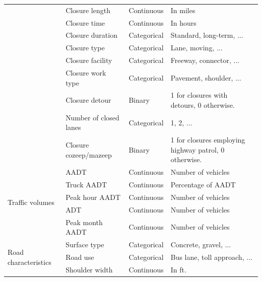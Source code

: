 \documentclass[10pt,a4paper]{article}
\begin{document}
\begin{table}[ht!]
\begin{tabular}{lllp{5cm}}
\multicolumn{1}{l|}{}                          & Closure length         & Continuous  & In miles\\
\multicolumn{1}{l|}{}                          & Closure time       & Continuous  & In hours\\
\multicolumn{1}{l|}{}                          & Closure duration       & Categorical  & Standard, long-term, ...\\
\multicolumn{1}{l|}{}                          & Closure type           & Categorical & Lane, moving, $\ldots$\\
\multicolumn{1}{l|}{}                          & Closure facility       & Categorical & Freeway, connector, $\ldots$\\
\multicolumn{1}{l|}{}                          & Closure work type      & Categorical & Pavement, shoulder, $\ldots$\\
\multicolumn{1}{l|}{}                          & Closure detour         & Binary      & 1 for closures with detours, 0 otherwise.\\
\multicolumn{1}{l|}{}                          & Number of closed lanes & Categorical & 1, 2, $\ldots$\\
\multicolumn{1}{l|}{}                          & Closure cozeep/mazeep  & Binary      & 1 for closures employing highway patrol, 0 otherwise.\\
\hline
\multicolumn{1}{l|}{\multirow{5}{*}{Traffic volumes}}  & AADT                   & Continuous  & Number of vehicles\\
\multicolumn{1}{l|}{}                          & Truck AADT             & Continuous  & Percentage of AADT\\
\multicolumn{1}{l|}{}                          & Peak hour AADT         & Continuous  & Number of vehicles\\
\multicolumn{1}{l|}{}                          & ADT                    & Continuous  & Number of vehicles\\
\multicolumn{1}{l|}{}                          & Peak month AADT        & Continuous  & Number of vehicles\\
\hline
\multicolumn{1}{l|}{\multirow{12}{*}{Road characteristics}}    & Surface type           & Categorical & Concrete, gravel, $\ldots$\\
\multicolumn{1}{l|}{}                          & Road use               & Categorical & Bus lane, toll approach, $\ldots$\\
\multicolumn{1}{l|}{}                          & Shoulder width         & Continuous  & In ft.\\

\end{tabular}
\end{table}
\end{document}

